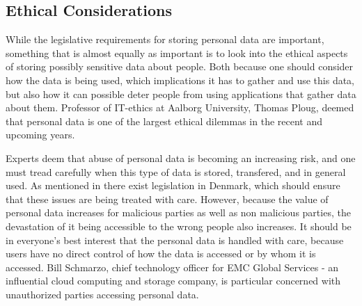 
\subsection{Ethical Considerations}
\label{sub:ethical_considerations}

While the legislative requirements for storing personal data are important, something that is almost equally as important is to look into the ethical aspects of storing possibly sensitive data about people. Both because one should consider how the data is being used, which implications it has to gather and use this data, but also how it can possible deter people from using applications that gather data about them. Professor of IT-ethics at Aalborg University, Thomas Ploug, deemed that personal data is one of the largest ethical dilemmas in the recent and upcoming years.


Experts deem that abuse of personal data is becoming an increasing risk, and one must tread carefully when this type of data is stored, transfered, and in general used. As mentioned in  there exist legislation in Denmark, which should ensure that these issues are being treated with care. However, because the value of personal data increases for malicious parties as well as non malicious parties, the devastation of it being accessible to the wrong people also increases. It should be in everyone's best interest that the personal data is handled with care, because users have no direct control of how the data is accessed or by whom it is accessed. Bill Schmarzo, chief technology officer for EMC Global Services - an influential cloud computing and storage company, is particular concerned with unauthorized parties accessing personal data.
\newpage
{}

